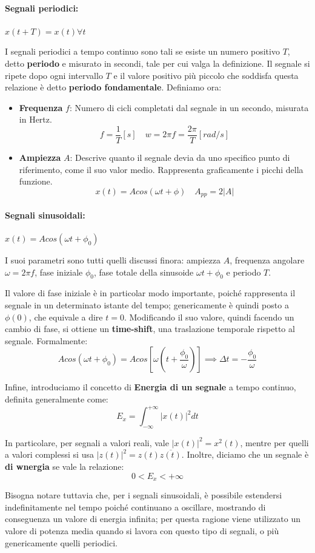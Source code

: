 \paragraph{Segnali periodici:} $x(t+T) = x(t) \forall t$\par
I segnali periodici a tempo continuo sono tali se esiste un numero positivo $T$, detto \textbf{periodo} e misurato in secondi, tale per cui valga la
definizione. Il segnale si ripete dopo ogni intervallo $T$ e il valore positivo più piccolo che soddisfa questa relazione è detto \textbf{periodo
fondamentale}. Definiamo ora: \begin{itemize}
    \item \textbf{Frequenza} $f$: Numero di cicli completati dal segnale in un secondo, misurata in Hertz. \[
        f = \frac{1}{T}[s]\quad w = 2\pi f = \frac{2\pi}{T}[rad/s]
    \]
    \item \textbf{Ampiezza} $A$: Descrive quanto il segnale devia da uno specifico punto di riferimento, come il suo valor medio. Rappresenta graficamente i picchi della funzione. \[
        x(t) = Acos(\omega t + \phi)\quad A_{pp} = 2|A|
    \]
\end{itemize}

\paragraph{Segnali sinusoidali:} $x(t) = Acos(\omega t + \phi_0)$\par
I suoi parametri sono tutti quelli discussi finora: ampiezza $A$, frequenza angolare $\omega = 2\pi f$, fase iniziale $\phi_0$, fase totale della
sinusoide $\omega t + \phi_0$ e periodo $T$.\par
Il valore di fase iniziale è in particolar modo importante, poiché rappresenta il segnale in un determinato istante del tempo; genericamente è quindi
posto a $\phi(0)$, che equivale a dire $t = 0$. Modificando il suo valore, quindi facendo un cambio di fase, si ottiene un \textbf{time-shift}, una
traslazione temporale rispetto al segnale. Formalmente: \[
    Acos(\omega t + \phi_0) = Acos\left[\omega \left( t + \frac{\phi_0}{\omega}\right)\right] \implies \Delta t = -\frac{\phi_0}{\omega}
\]

\noindent Infine, introduciamo il concetto di \textbf{Energia di un segnale} a tempo continuo, definita generalmente come: \[
    E_x = \int_{-\infty}^{+\infty} |x(t)|^2 dt
\]

\noindent In particolare, per segnali a valori reali, vale $|x(t)|^2 = x^2(t)$, mentre per quelli a valori complessi si usa
$|z(t)|^2 = z(t)\overline{z(t)}$. Inoltre, diciamo che un segnale è \textbf{di wnergia} se vale la relazione: \[
    0 < E_x < +\infty
\]

\noindent Bisogna notare tuttavia che, per i segnali sinusoidali, è possibile estendersi indefinitamente nel tempo poiché continuano a oscillare,
mostrando di conseguenza un valore di energia infinita; per questa ragione viene utilizzato un valore di potenza media quando si lavora con questo tipo
di segnali, o più genericamente quelli periodici.